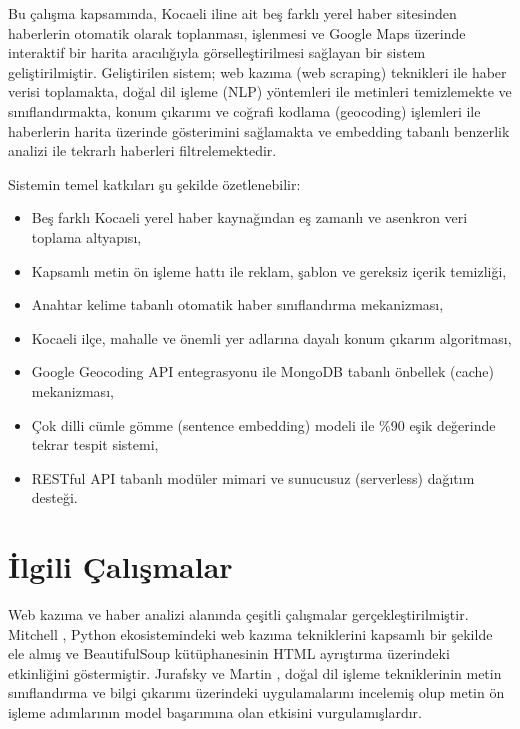 \documentclass[conference]{IEEEtran}
\begin{document}
Bu çalışma kapsamında, Kocaeli iline ait beş farklı yerel haber sitesinden haberlerin otomatik olarak toplanması, işlenmesi ve Google Maps üzerinde interaktif bir harita aracılığıyla görselleştirilmesi sağlayan bir sistem geliştirilmiştir. Geliştirilen sistem; web kazıma (web scraping) teknikleri ile haber verisi toplamakta, doğal dil işleme (NLP) yöntemleri ile metinleri temizlemekte ve sınıflandırmakta, konum çıkarımı ve coğrafi kodlama (geocoding) işlemleri ile haberlerin harita üzerinde gösterimini sağlamakta ve embedding tabanlı benzerlik analizi ile tekrarlı haberleri filtrelemektedir.

Sistemin temel katkıları şu şekilde özetlenebilir:

\begin{itemize}[leftmargin=*]
    \item Beş farklı Kocaeli yerel haber kaynağından eş zamanlı ve asenkron veri toplama altyapısı,
    \item Kapsamlı metin ön işleme hattı ile reklam, şablon ve gereksiz içerik temizliği,
    \item Anahtar kelime tabanlı otomatik haber sınıflandırma mekanizması,
    \item Kocaeli ilçe, mahalle ve önemli yer adlarına dayalı konum çıkarım algoritması,
    \item Google Geocoding API entegrasyonu ile MongoDB tabanlı önbellek (cache) mekanizması,
    \item Çok dilli cümle gömme (sentence embedding) modeli ile \%90 eşik değerinde tekrar tespit sistemi,
    \item RESTful API tabanlı modüler mimari ve sunucusuz (serverless) dağıtım desteği.
\end{itemize}

\section{İlgili Çalışmalar}
\label{sec:ilgili}

Web kazıma ve haber analizi alanında çeşitli çalışmalar gerçekleştirilmiştir. Mitchell \cite{mitchell2018}, Python ekosistemindeki web kazıma tekniklerini kapsamlı bir şekilde ele almış ve BeautifulSoup kütüphanesinin HTML ayrıştırma üzerindeki etkinliğini göstermiştir. Jurafsky ve Martin \cite{jurafsky2024}, doğal dil işleme tekniklerinin metin sınıflandırma ve bilgi çıkarımı üzerindeki uygulamalarını incelemiş olup metin ön işleme adımlarının model başarımına olan etkisini vurgulamışlardır.
\end{document}
